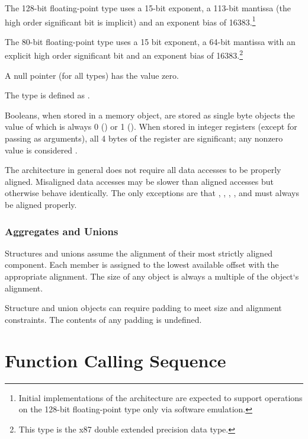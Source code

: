 The 128-bit floating-point type uses a 15-bit exponent, a 113-bit
mantissa (the high order significant bit is implicit) and an exponent
bias of 16383.\footnote{Initial implementations of the \xARCH
  architecture are expected to support operations on the
  128-bit floating-point  type only via software emulation.}

The 80-bit floating-point type uses a 15 bit exponent, a 64-bit mantissa
with an explicit high order significant bit and an exponent bias of
16383.\footnote{This type is the x87 double extended precision data
  type.} 

A null pointer (for all types) has the value zero.

The type  is defined as .

Booleans, when stored in a memory object, are stored as
single byte objects the value of which is always 0 () or 1
().  When stored in integer registers (except for passing
as arguments), all 4 bytes of the register are significant;
any nonzero value is considered .

\begin{sloppypar}
The \xARCH architecture in general
does not require all data accesses to be properly aligned.  Misaligned
data accesses may be slower than aligned accesses
but otherwise behave identically.  The only exceptions are that
, ,  ,
,  and  must always be aligned
properly.
\end{sloppypar}

\subsubsection{Aggregates and Unions}

Structures and unions assume the alignment of their most strictly
aligned component.  Each member is assigned to the lowest available
offset with the appropriate alignment.  The size of any object is always
a multiple of the object`s alignment.

Structure and union objects can require padding to meet size and
alignment constraints.  The contents of any padding is undefined.


\section{Function Calling Sequence}

